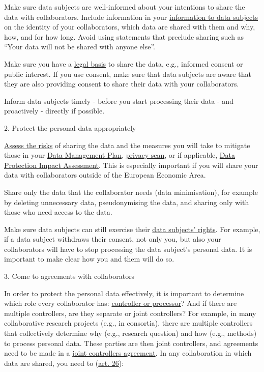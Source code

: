\documentclass[
]{book}
\begin{document}
Make sure data subjects are well-informed about your intentions to
share the data with collaborators. Include information in your
\protect\hyperlink{privacy-notices}{information to data subjects} on the identity of your
collaborators, which data are shared with them and why, how, and for how
long. Avoid using statements that preclude sharing such as ``Your data
will not be shared with anyone else''.

Make sure you have a \protect\hyperlink{legal-basis}{legal basis} to
share the data, e.g., informed consent or public interest. If you use
consent, make sure that data subjects are aware that they are also
providing consent to share their data with your collaborators.

Inform data subjects timely - before you start processing
their data - and proactively - directly if possible.

2. Protect the personal data appropriately

\protect\hyperlink{risk-assessment}{Assess the risks} of sharing the
data and the measures you will take to mitigate those in your
\href{https://www.uu.nl/en/research/research-data-management/guides/data-management-planning}{Data Management Plan},
\protect\hyperlink{privacy-scan}{privacy scan}, or if applicable,
\protect\hyperlink{dpia}{Data Protection Impact Assessment}.
This is especially important if you will share your data with
collaborators outside of the European Economic Area.

Share only the data that the collaborator needs (data minimisation),
for example by deleting unnecessary data, pseudonymising the data, and
sharing only with those who need access to the data.

Make sure data subjects can still exercise their
\protect\hyperlink{data-subject-rights}{data subjects' rights}. For example,
if a data subject withdraws their consent, not only you, but also your
collaborators will have to stop processing the data subject's personal
data. It is important to make clear how you and them will do so.

3. Come to agreements with collaborators

In order to protect the personal data effectively, it is important to
determine which role every collaborator has:
\protect\hyperlink{definitions}{controller or processor}? And if there are
multiple controllers, are they separate or joint controllers? For example,
in many collaborative research projects (e.g., in consortia), there are
multiple controllers that collectively determine why (e.g., research
question) and how (e.g., methods) to process personal data. These parties
are then joint controllers, and agreements need to be made in a
\protect\hyperlink{joint-controller-agreement}{joint controllers agreement}.
In any collaboration in which data are shared, you need to
(\href{https://gdpr-info.eu/art-26-gdpr/}{art. 26}):
\end{document}
